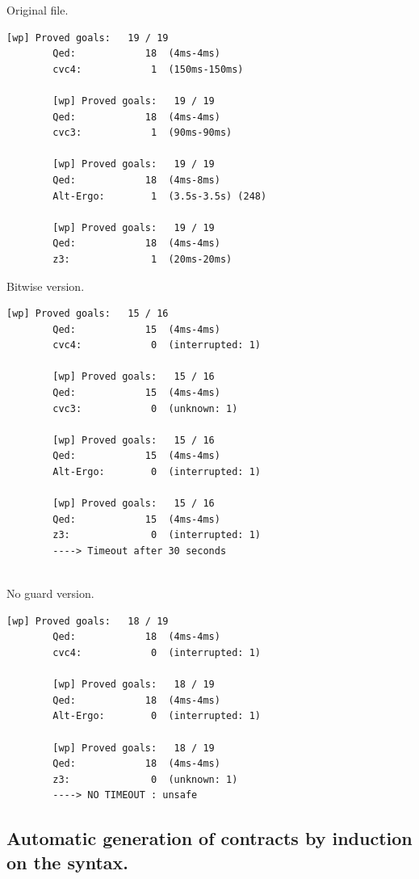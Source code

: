 \documentclass[a4paper,11pt,final]{article}
\begin{document}
	\begin{minipage}{\textwidth}
	\begin{multicols}{3}
		Original file.
		\begin{lstlisting}[basicstyle=\tiny]
		[wp] Proved goals:   19 / 19
		Qed:            18  (4ms-4ms)
		cvc4:            1  (150ms-150ms)
		
		[wp] Proved goals:   19 / 19
		Qed:            18  (4ms-4ms)
		cvc3:            1  (90ms-90ms)
		
		[wp] Proved goals:   19 / 19
		Qed:            18  (4ms-8ms)
		Alt-Ergo:        1  (3.5s-3.5s) (248)
		
		[wp] Proved goals:   19 / 19
		Qed:            18  (4ms-4ms)
		z3:              1  (20ms-20ms)
		\end{lstlisting}
		\columnbreak
		Bitwise version.
		\begin{lstlisting}[basicstyle=\tiny]
		[wp] Proved goals:   15 / 16
		Qed:            15  (4ms-4ms)
		cvc4:            0  (interrupted: 1)
		
		[wp] Proved goals:   15 / 16
		Qed:            15  (4ms-4ms)
		cvc3:            0  (unknown: 1)
		
		[wp] Proved goals:   15 / 16
		Qed:            15  (4ms-4ms)
		Alt-Ergo:        0  (interrupted: 1)
		
		[wp] Proved goals:   15 / 16
		Qed:            15  (4ms-4ms)
		z3:              0  (interrupted: 1)    
		----> Timeout after 30 seconds
		
		\end{lstlisting}
		\columnbreak
		No guard version.
		\begin{lstlisting}[basicstyle=\tiny]
		[wp] Proved goals:   18 / 19
		Qed:            18  (4ms-4ms)
		cvc4:            0  (interrupted: 1)
		
		[wp] Proved goals:   18 / 19
		Qed:            18  (4ms-4ms)
		Alt-Ergo:        0  (interrupted: 1)
		
		[wp] Proved goals:   18 / 19
		Qed:            18  (4ms-4ms)
		z3:              0  (unknown: 1)   
		----> NO TIMEOUT : unsafe
		\end{lstlisting}
	\end{multicols}
	\end{minipage}
	
	\subsection{Automatic generation of contracts by induction on the syntax.}
	
\end{document}
